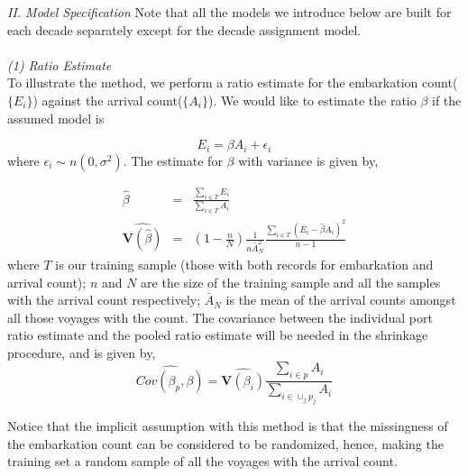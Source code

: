 \documentclass[preprint,12pt]{elsarticle}
\begin{document}
\begin{table}
\end{table}

\textit{II. Model Specification}
\indent
Note that all the models we introduce below are built for each decade separately except for the 
decade assignment model.\\
\\
\textit{(1) Ratio Estimate}\\
\indent
To illustrate the method, we perform a ratio estimate for the
embarkation count($\{E_i\}$) against the arrival count($\{A_i\}$).  We would
like to estimate the ratio $\beta$ if the assumed model is

\begin{equation}
E_i = \beta A_i + \epsilon_i
\end{equation}
where $\epsilon_i \sim n(0,\sigma^2)$.  The estimate for $\beta$ with
variance is given by,

\begin{eqnarray}
\hat{\beta} &=& \frac{\sum_{i \in T} E_i}{\sum_{i \in T} A_i}\\
\widehat{\mathbf{V}(\hat{\beta})} &=& (1 - \frac{n}{N})\frac{1}{n
  \bar{A}_N^2}\frac{\sum_{i \in T} (E_i - \hat{\beta} A_i)^2}{n - 1}
\end{eqnarray} 
where $T$ is our training sample (those with both records for
embarkation and arrival count); $n$ and $N$ are the size of the
training sample and all the samples with the arrival count
respectively; $\bar{A}_N$ is the mean of the arrival counts amongst
all those voyages with the count.
The covariance between the individual port ratio estimate and the pooled ratio estimate will be needed in the shrinkage procedure, and is given by,
\begin{equation}
\widehat{Cov(\beta_{p},\beta)} = \widehat{\mathbf{V}(\beta_i)} \frac{\sum_{i \in p} A_i}{\sum_{i \in \cup_j p_j} A_i}
\end{equation}
\par
Notice that the implicit assumption with this method is that the
missingness of the embarkation count can be considered to be randomized, 
hence, making the training set a random sample of all the
voyages with the arrival count.\\
\end{document}
